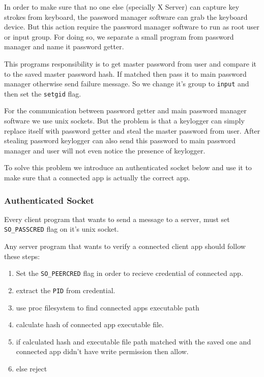 \documentclass[journal]{IEEEtran}
\begin{document}
In order to make sure that no one else (specially X Server) can capture key strokes from keyboard, the password manager software can grab the keyboard device. But this action require the password manager software to run as root user or input group. For doing so, we separate a small program from password manager and name it password getter. 


This programs responsibility is to get master password from user and compare it to the saved master password hash. If matched then pass it to main password manager otherwise send failure message. So we change 
it's group to \texttt{input} and then set the \texttt{setgid} flag. 

For the communication between password getter and main password manager software we use unix sockets. But the problem is that a keylogger can simply replace itself with password getter and steal the master password from user. After stealing password keylogger can also send this password to main password manager and user will not even notice the presence of keylogger.

To solve this problem we introduce an authenticated socket below and use it to make sure that a connected app is actually the correct app.

\subsubsection{Authenticated Socket}
\label{authentic}

Every client program that wants to send a message to a server, must set \texttt{SO\_PASSCRED} flag on it's unix socket.

Any server program that wants to verify a connected client app should follow these steps:

\begin{enumerate}

\item Set the \texttt{SO\_PEERCRED} flag in order to recieve credential of connected app.
\item extract the \texttt{PID} from credential.
\item use proc filesystem to find connected apps executable path
\item calculate hash of connected app executable file.
\item if calculated hash and executable file path matched with the saved one and connected app didn't have write permission then allow.
\item else reject

\end{enumerate}
\end{document}
